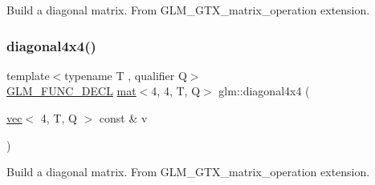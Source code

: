 Build a diagonal matrix. From G\+L\+M\+\_\+\+G\+T\+X\+\_\+matrix\+\_\+operation extension. \mbox{\label{group__gtx__matrix__operation_ga0b4cd8dea436791b072356231ee8578f}} 
\subsubsection{\texorpdfstring{diagonal4x4()}{diagonal4x4()}}
{\footnotesize\ttfamily template$<$typename T , qualifier Q$>$ \\
\mbox{\hyperlink{setup_8hpp_ab2d052de21a70539923e9bcbf6e83a51}{G\+L\+M\+\_\+\+F\+U\+N\+C\+\_\+\+D\+E\+CL}} \mbox{\hyperlink{structglm_1_1mat}{mat}}$<$4, 4, T, Q$>$ glm\+::diagonal4x4 (\begin{DoxyParamCaption}\item[{\mbox{\hyperlink{structglm_1_1vec}{vec}}$<$ 4, T, Q $>$ const \&}]{v }\end{DoxyParamCaption})}

Build a diagonal matrix. From G\+L\+M\+\_\+\+G\+T\+X\+\_\+matrix\+\_\+operation extension. 